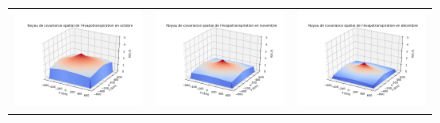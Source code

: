 \documentclass[a4paper,11pt]{article}
\numberwithin{equation}{section}
\begin{document}
\begin{figure}[H]
\hspace{-1.3cm}
\begin{tabular}{ccc}
	\includegraphics[scale=0.34]{images/kernel_evap_m10.png} & \includegraphics[scale=0.34]{images/kernel_evap_m11.png} & \includegraphics[scale=0.34]{images/kernel_evap_m12.png} \\

\end{tabular}
\end{figure}
\end{document}
